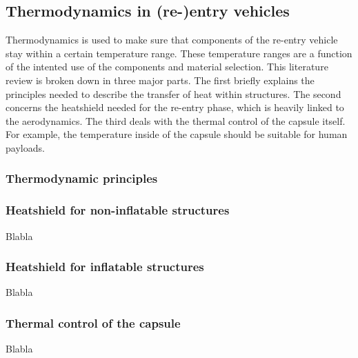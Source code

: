 \subsection{Thermodynamics in (re-)entry vehicles}\label{sec:thermo}
Thermodynamics is used to make sure that components of the re-entry vehicle stay within a certain temperature range. These temperature ranges are a function of the intented use of the components and material selection. This literature review is broken down in three major parts. The first briefly explains the principles needed to describe the transfer of heat within structures. The second concerns the heatshield needed for the re-entry phase, which is heavily linked to the aerodynamics. The third deals with the thermal control of the capsule itself. For example, the temperature inside of the capsule should be suitable for human payloads.

\subsubsection{Thermodynamic principles}

\subsubsection{Heatshield for non-inflatable structures}
Blabla

\subsubsection{Heatshield for inflatable structures}
Blabla

\subsubsection{Thermal control of the capsule}
Blabla




